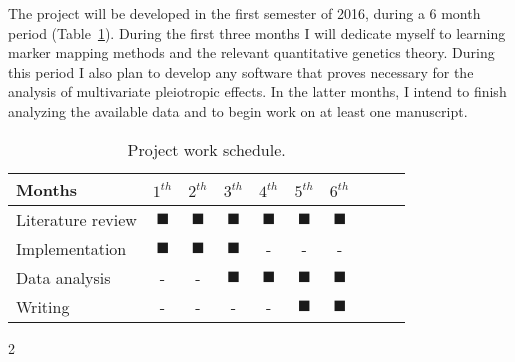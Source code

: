 \documentclass[twoside,a4paper,12pt]{article}
\begin{document}
The project will be developed in the first semester of 2016, during a 6
month period (Table~\ref {tab:crono}). During the first three months I
will dedicate myself to learning marker mapping methods and the relevant
quantitative genetics theory. During this period I also plan to develop
any software that proves necessary for the analysis of multivariate
pleiotropic effects. In the latter months, I intend to finish
analyzing the available data and to begin work on at least one manuscript.

\begin{table}[H]
    \hr
    \caption {Project work schedule.}
    \hr
    \begin{center}
    \begin{tabular}{lc*{4}{cc}}
        \toprule
    Months & $1^{th}$ & $2^{th}$ & $3^{th}$ & $4^{th}$ & $5^{th}$ & $6^{th}$ \\
              \midrule
  Literature review &$\blacksquare$&$\blacksquare$&$\blacksquare$&$\blacksquare$& $\blacksquare$&$\blacksquare$\\
  Implementation &$\blacksquare$&$\blacksquare$&$\blacksquare$&-&-&-\\
  Data analysis &-&-&$\blacksquare$&$\blacksquare$&$\blacksquare$&$\blacksquare$\\
  Writing  &-&-&-&-&$\blacksquare$&$\blacksquare$\\
  \bottomrule

  \end{tabular}
  \end{center}
  \label{tab:crono}
\end{table}


\singlespacing
\begin{multicols} {2}
\scriptsize{}
\end{multicols}
\end{document}
